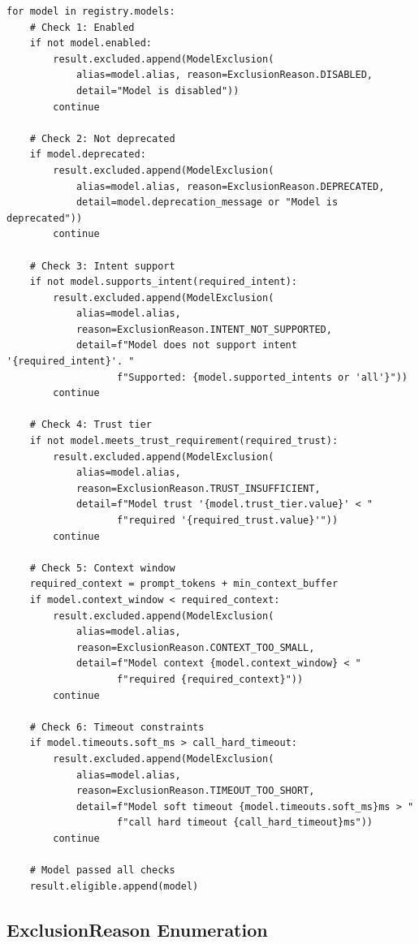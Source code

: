 \documentclass[11pt,a4paper]{article}
\theoremstyle{plain}
\theoremstyle{definition}
\begin{document}
\begin{lstlisting}[style=pythonstyle, caption={Six-stage filter cascade core loop from \texttt{dial.py}}, label={lst:cascade}]
for model in registry.models:
    # Check 1: Enabled
    if not model.enabled:
        result.excluded.append(ModelExclusion(
            alias=model.alias, reason=ExclusionReason.DISABLED,
            detail="Model is disabled"))
        continue

    # Check 2: Not deprecated
    if model.deprecated:
        result.excluded.append(ModelExclusion(
            alias=model.alias, reason=ExclusionReason.DEPRECATED,
            detail=model.deprecation_message or "Model is deprecated"))
        continue

    # Check 3: Intent support
    if not model.supports_intent(required_intent):
        result.excluded.append(ModelExclusion(
            alias=model.alias,
            reason=ExclusionReason.INTENT_NOT_SUPPORTED,
            detail=f"Model does not support intent '{required_intent}'. "
                   f"Supported: {model.supported_intents or 'all'}"))
        continue

    # Check 4: Trust tier
    if not model.meets_trust_requirement(required_trust):
        result.excluded.append(ModelExclusion(
            alias=model.alias,
            reason=ExclusionReason.TRUST_INSUFFICIENT,
            detail=f"Model trust '{model.trust_tier.value}' < "
                   f"required '{required_trust.value}'"))
        continue

    # Check 5: Context window
    required_context = prompt_tokens + min_context_buffer
    if model.context_window < required_context:
        result.excluded.append(ModelExclusion(
            alias=model.alias,
            reason=ExclusionReason.CONTEXT_TOO_SMALL,
            detail=f"Model context {model.context_window} < "
                   f"required {required_context}"))
        continue

    # Check 6: Timeout constraints
    if model.timeouts.soft_ms > call_hard_timeout:
        result.excluded.append(ModelExclusion(
            alias=model.alias,
            reason=ExclusionReason.TIMEOUT_TOO_SHORT,
            detail=f"Model soft timeout {model.timeouts.soft_ms}ms > "
                   f"call hard timeout {call_hard_timeout}ms"))
        continue

    # Model passed all checks
    result.eligible.append(model)
\end{lstlisting}

\subsection{ExclusionReason Enumeration}
\end{document}
